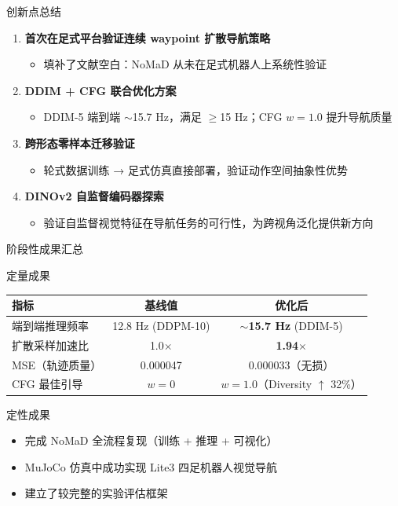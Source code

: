 \documentclass[aspectratio=169,10pt]{beamer}
\begin{document}
\begin{frame}{创新点总结}
\begin{enumerate}
\item \textbf{首次在足式平台验证连续 waypoint 扩散导航策略}
\begin{itemize}
\item 填补了文献空白：NoMaD 从未在足式机器人上系统性验证
\end{itemize}
\pause
\item \textbf{DDIM + CFG 联合优化方案}
\begin{itemize}
\item DDIM-5 端到端 $\sim$15.7 Hz，满足 $\geq$15 Hz；CFG $w{=}1.0$ 提升导航质量
\end{itemize}
\pause
\item \textbf{跨形态零样本迁移验证}
\begin{itemize}
\item 轮式数据训练 → 足式仿真直接部署，验证动作空间抽象性优势
\end{itemize}
\pause
\item \textbf{DINOv2 自监督编码器探索}
\begin{itemize}
\item 验证自监督视觉特征在导航任务的可行性，为跨视角泛化提供新方向
\end{itemize}
\end{enumerate}
\end{frame}

\begin{frame}{阶段性成果汇总}
\begin{block}{定量成果}
\centering
\begin{tabular}{lcc}
\toprule
\textbf{指标} & \textbf{基线值} & \textbf{优化后} \\
\midrule
端到端推理频率 & 12.8 Hz (DDPM-10) & \textbf{$\sim$15.7 Hz} (DDIM-5) \\
扩散采样加速比 & 1.0$\times$ & \textbf{1.94$\times$} \\
MSE（轨迹质量） & 0.000047 & 0.000033（无损） \\
CFG 最佳引导 & $w{=}0$ & $w{=}1.0$（Diversity $\uparrow$ 32\%） \\
\bottomrule
\end{tabular}
\end{block}
\vspace{3mm}
\begin{block}{定性成果}
\begin{itemize}
\item 完成 NoMaD 全流程复现（训练 + 推理 + 可视化）
\item MuJoCo 仿真中成功实现 Lite3 四足机器人视觉导航
\item 建立了较完整的实验评估框架
\end{itemize}
\end{block}
\end{frame}
\end{document}
